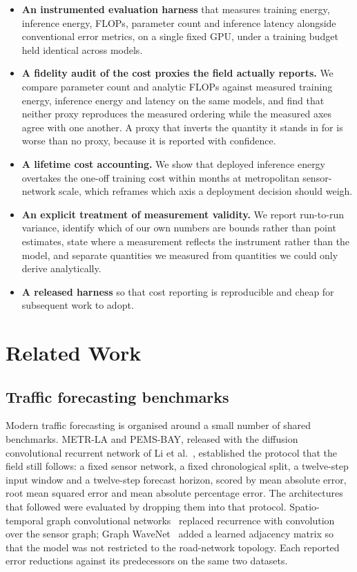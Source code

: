 \documentclass[manuscript,screen,review]{acmart}
\begin{document}
\begin{itemize}
  \item \textbf{An instrumented evaluation harness} that measures training
        energy, inference energy, FLOPs, parameter count and inference
        latency alongside conventional error metrics, on a single fixed
        GPU, under a training budget held identical across models.
  \item \textbf{A fidelity audit of the cost proxies the field actually
        reports.} We compare parameter count and analytic FLOPs against
        measured training energy, inference energy and latency on the same
        models, and find that neither proxy reproduces the measured
        ordering while the measured axes agree with one another. A proxy
        that inverts the quantity it stands in for is worse than no proxy,
        because it is reported with confidence.
  \item \textbf{A lifetime cost accounting.} We show that deployed
        inference energy overtakes the one-off training cost within months
        at metropolitan sensor-network scale, which reframes which axis a
        deployment decision should weigh.
  \item \textbf{An explicit treatment of measurement validity.} We report
        run-to-run variance, identify which of our own numbers are bounds
        rather than point estimates, state where a measurement reflects
        the instrument rather than the model, and separate quantities we
        measured from quantities we could only derive analytically.
  \item \textbf{A released harness} so that cost reporting is reproducible
        and cheap for subsequent work to adopt.
\end{itemize}

\section{Related Work}
\subsection{Traffic forecasting benchmarks}
Modern traffic forecasting is organised around a small number of shared
benchmarks. METR-LA and PEMS-BAY, released with the diffusion convolutional
recurrent network of Li et al.~\cite{li2018dcrnn}, established the protocol
that the field still follows: a fixed sensor network, a fixed chronological
split, a twelve-step input window and a twelve-step forecast horizon, scored
by mean absolute error, root mean squared error and mean absolute percentage
error. The architectures that followed were evaluated by dropping them into
that protocol. Spatio-temporal graph convolutional networks~\cite{yu2018stgcn}
replaced recurrence with convolution over the sensor graph; Graph
WaveNet~\cite{wu2019graphwavenet} added a learned adjacency matrix so that the
model was not restricted to the road-network topology. Each reported error
reductions against its predecessors on the same two datasets.
\end{document}
